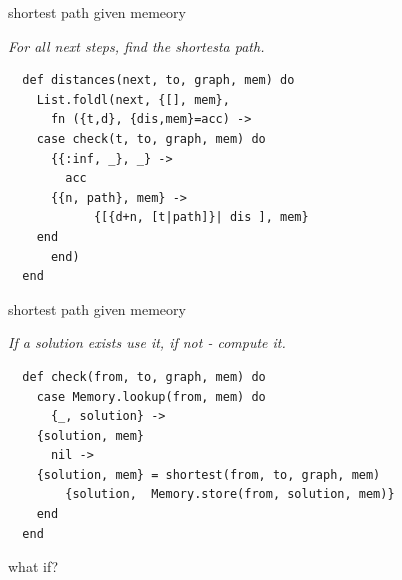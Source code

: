 \begin{frame}[fragile]{shortest path given memeory}

\pause\vspace{10pt}

{\em For all next steps, find the shortesta path.}

\pause\vspace{10pt}

\begin{verbatim}
  def distances(next, to, graph, mem) do
    List.foldl(next, {[], mem},
      fn ({t,d}, {dis,mem}=acc) ->
	case check(t, to, graph, mem) do
	  {{:inf, _}, _} ->
	    acc
	  {{n, path}, mem} ->
            {[{d+n, [t|path]}| dis ], mem}
	end
      end)
  end
\end{verbatim}
\end{frame}

\begin{frame}[fragile]{shortest path given memeory}

{\em If a solution exists use it, if not - compute it.}

\begin{verbatim}
  def check(from, to, graph, mem) do
    case Memory.lookup(from, mem) do
      {_, solution} ->
	{solution, mem}
      nil ->
	{solution, mem} = shortest(from, to, graph, mem)
        {solution,  Memory.store(from, solution, mem)}
    end
  end
\end{verbatim}
\end{frame}



\begin{frame}{what if?}

\begin{figure}
\end{figure}

\end{frame}

